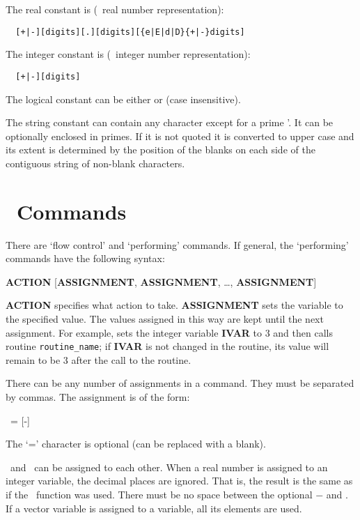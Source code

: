 The real constant is (\FORTRAN\ real number representation):
\begin{verbatim}
  [+|-][digits][.][digits][{e|E|d|D}{+|-}digits]
\end{verbatim}

The integer constant is (\FORTRAN\ integer number representation): 
\begin{verbatim}
  [+|-][digits] 
\end{verbatim}

The logical constant can be either  or  (case insensitive).

The string constant can contain any character except for a prime
'. It can be optionally
enclosed in primes.  If it is not quoted it is converted to
upper case and its extent is determined by the position of the blanks
on each side of the contiguous string of non-blank characters.


\section{\TOP\ Commands}

There are `flow control' and `performing' commands. If general, 
the `performing' commands have the following syntax:

{\bf ACTION} [{\bf ASSIGNMENT}, {\bf ASSIGNMENT}, \ldots, {\bf ASSIGNMENT}]

{\bf ACTION} specifies what action to take. {\bf ASSIGNMENT} sets the
variable to the specified value.  The values assigned in this way are
kept until the next assignment. For example, 
 sets the integer variable 
{\bf IVAR} to 3 and then calls routine {\tt routine\_name}; if {\bf IVAR} is
not changed in the routine, its value will remain to be 3 after the call
to the routine.

There can be any number of assignments in a command. They must be
separated by commas. The assignment is of the form:

\ = [-]

The `=' character is optional (can be replaced with a blank). 

\ and \ can be assigned to each other. When a real number 
is assigned to an integer variable, the decimal places are ignored.
That is, the result is the same as if the \FORTRAN\ function  was
used. There must be no space between the optional $-$ and .
If a vector variable is assigned to a variable, all its elements
are used.

